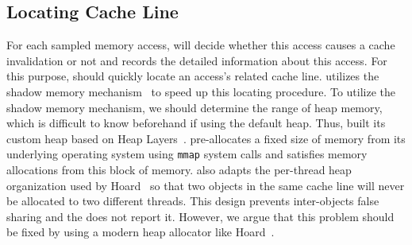 \subsection{Locating Cache Line}
\label{sec:shadow}

For each sampled memory access, \cheetah{} will decide whether this access causes a cache invalidation or not and records the detailed information about this access. For this purpose, \cheetah{} should quickly locate an access's related cache line. \Cheetah{} utilizes the shadow memory mechanism~\cite{qinzhao, Predator} to speed up this locating procedure. 
To utilize the shadow memory mechanism, we should determine the range of heap memory, which is difficult to know beforehand if using the default heap. Thus, \cheetah{} built its custom heap based on Heap Layers~\cite{Berger:2001:CHM:378795.378821}. \cheetah{} pre-allocates a fixed size of memory
from its underlying operating system using \texttt{mmap} system calls and satisfies memory allocations from this block of memory. \cheetah{} also adapts the per-thread heap organization used by Hoard~\cite{Hoard} so that two objects in the same cache line will never be allocated to two different threads. This design prevents inter-objects false sharing and the \cheetah{} does not report it.
However, we argue that this problem should be fixed by using a modern heap allocator like Hoard~\cite{Hoard}. 

